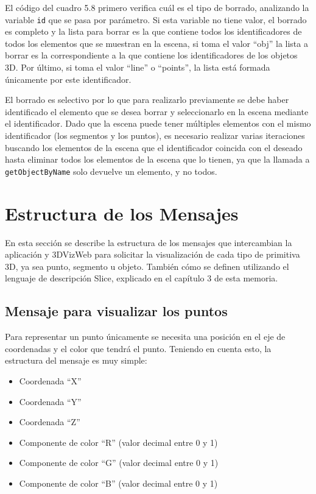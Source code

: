 El código del cuadro 5.8 primero verifica cuál es el tipo de borrado, analizando la variable \texttt{id} que se pasa por parámetro. Si esta variable no tiene valor, el borrado es completo y la lista para borrar es la que contiene todos los identificadores de todos los elementos que se muestran en la escena, si toma el valor ``obj'' la lista a borrar es la correspondiente a la que contiene los identificadores de los objetos 3D. Por último, si toma el valor ``line'' o ``points'', la lista está formada únicamente por este identificador.

El borrado es selectivo por lo que para realizarlo previamente se debe haber identificado el elemento que se desea borrar y seleccionarlo en la escena mediante el identificador. Dado que la escena puede tener múltiples elementos con el mismo identificador (los segmentos y los puntos), es necesario realizar varias iteraciones buscando los elementos de la escena que el identificador coincida con el deseado hasta eliminar todos los elementos de la escena que lo tienen, ya que la llamada a \texttt{getObjectByName} solo devuelve un elemento, y no todos.

\section{Estructura de los Mensajes}
En esta sección se describe la estructura de los mensajes que intercambian la aplicación y 3DVizWeb para solicitar la visualización de cada tipo de primitiva 3D, ya sea punto, segmento u objeto. También cómo se definen utilizando el lenguaje de descripción Slice, explicado en el capítulo 3 de esta memoria. 
\subsection{Mensaje para visualizar los puntos}
Para representar un punto únicamente se necesita una posición en el eje de coordenadas y el color que tendrá el punto. Teniendo en cuenta esto, la estructura del mensaje es muy simple:
\begin{itemize}
\item Coordenada ``X''
\item Coordenada ``Y''
\item Coordenada ``Z''
\item Componente de color ``R'' (valor decimal entre 0 y 1)
\item Componente de color ``G'' (valor decimal entre 0 y 1)
\item Componente de color ``B'' (valor decimal entre 0 y 1)
\end{itemize}

